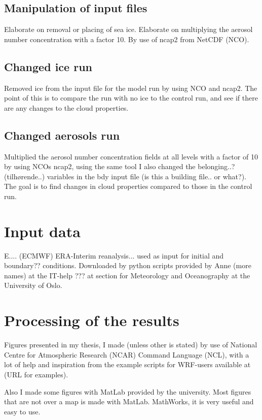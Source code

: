 \subsection{Manipulation of input files}
Elaborate on removal or placing of sea ice. Elaborate on multiplying the aerosol number concentration with a factor 10. By use of ncap2 from NetCDF (NCO).
\subsection{Changed ice run}
Removed ice from the input file for the model run by using NCO and ncap2. The point of this is to compare the run with no ice to the control run, and see if there are any changes to the cloud properties.
\subsection{Changed aerosols run}
Multiplied the aerosol number concentration fields at all levels with a factor of 10 by using NCOs ncap2, using the same tool I also changed the belonging..? (tilhørende..) variables in the bdy input file (is this a building file.. or what?). The goal is to find changes in cloud properties compared to those in the control run.

\section{Input data}
E.... (ECMWF) ERA-Interim reanalysis... used as input for initial and boundary?? conditions. Downloaded by python scripts provided by Anne (more names) at the IT-help ??? at section for Meteorology and Oceanography at the University of Oslo.

\section{Processing of the results}
Figures presented in my thesis, I made (unless other is stated) by use of National Centre for Atmospheric Research (NCAR) Command Language (NCL), with a lot of help and inspiration from the example scripts for WRF-users available at (URL for examples).

Also I made some figures with MatLab provided by the university. Most figures that are not over a map is made with MatLab. MathWorks, it is very useful and easy to use.